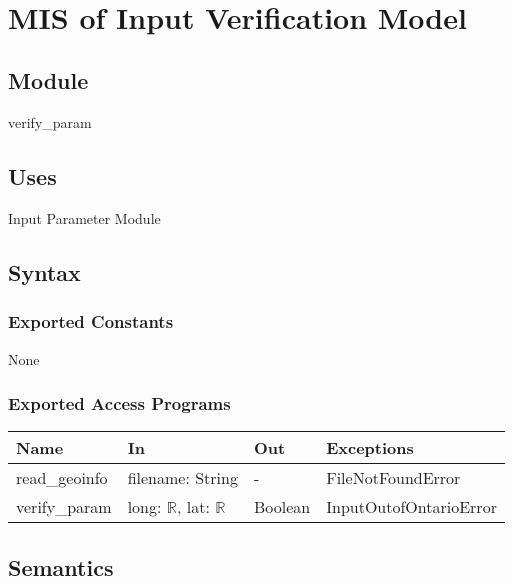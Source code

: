 \documentclass[12pt, titlepage]{article}
\begin{document}
  
~\newpage

\section{MIS of Input Verification Model} \label{inputVerificationModule} 



\subsection{Module}

verify\_param

\subsection{Uses}
Input Parameter Module

\subsection{Syntax}

\subsubsection{Exported Constants}
None

\subsubsection{Exported Access Programs}

\begin{center}
\begin{tabular}{p{3cm} p{4cm} p{2cm} p{5cm}}
\hline
\textbf{Name} & \textbf{In} & \textbf{Out} & \textbf{Exceptions} \\
\hline
read\_geoinfo & filename: String & - & FileNotFoundError\\
verify\_param & long: $\mathbb{R}$, lat: $\mathbb{R}$ & Boolean & InputOutofOntarioError \\
\hline
\end{tabular}
\end{center}

\subsection{Semantics}
\end{document}
